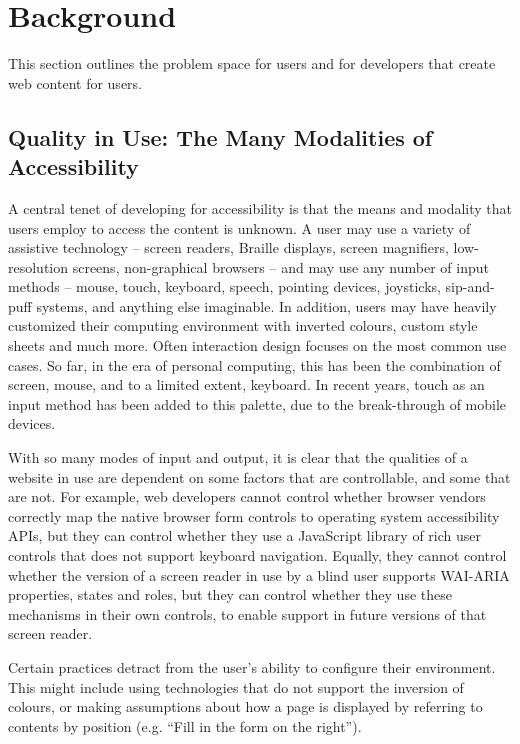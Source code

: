 \section{Background} %
\label{sec:problem_space}

This section outlines the problem space for users and for developers that create web content for users.


\subsection{Quality in Use: The Many Modalities of Accessibility} %
\label{sub:access_methods}

A central tenet of developing for accessibility is that the means and modality that users employ to access the content is unknown. A user may use a variety of assistive technology -- screen readers, Braille displays, screen magnifiers, low-resolution screens, non-graphical browsers -- and may use any number of input methods -- mouse, touch, keyboard, speech, pointing devices, joysticks, sip-and-puff systems, and anything else imaginable. In addition, users may have heavily customized their computing environment with inverted colours, custom style sheets and much more. Often interaction design focuses on the most common use cases. So far, in the era of personal computing, this has been the combination of screen, mouse, and to a limited extent, keyboard. In recent years, touch as an input method has been added to this palette, due to the break-through of mobile devices.

With so many modes of input and output, it is clear that the qualities of a website in use are dependent on some factors that are controllable, and some that are not. For example, web developers cannot control whether browser vendors correctly map the native browser form controls to operating system accessibility APIs, but they can control whether they use a JavaScript library of rich user controls that does not support keyboard navigation. Equally, they cannot control whether the version of a screen reader in use by a blind user supports \ac{WAI-ARIA} properties, states and roles, but they can control whether they use these mechanisms in their own controls, to enable support in future versions of that screen reader.

Certain practices detract from the user's ability to configure their environment. This might include using technologies that do not support the inversion of colours, or making assumptions about how a page is displayed by referring to contents by position (e.g. ``Fill in the form on the right'').

